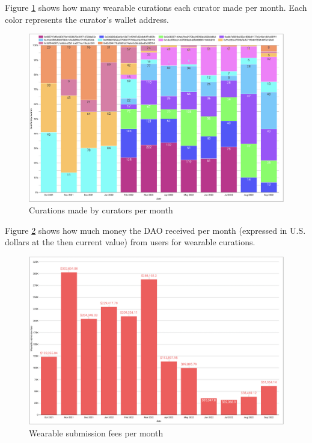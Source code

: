 \documentclass[MSE,Master,english]{twbook}%
\begin{document}
Figure \ref{fig:curations} shows how many wearable curations each curator made per month. Each color represents the curator's wallet address.
\begin{figure}[H]
  \centering
  \includegraphics[width=\textwidth]{metrics/curations.png}
  \caption{Curations made by curators per month}
  \label{fig:curations}
\end{figure}

Figure \ref{fig:submission_fees} shows how much money the DAO received per month (expressed in U.S. dollars at the then current value) from users for wearable curations.
\begin{figure}[H]
  \centering
  \includegraphics[width=\textwidth]{metrics/submission_fees.png}
  \caption{Wearable submission fees per month}
  \label{fig:submission_fees}
\end{figure}
\end{document}
